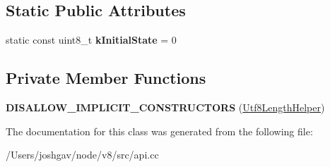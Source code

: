 \subsection*{Static Public Attributes}
\begin{DoxyCompactItemize}
\item 
static const uint8\+\_\+t {\bfseries k\+Initial\+State} = 0\hypertarget{classv8_1_1_utf8_length_helper_a20624c47006b9117c0c7079f8a7f6f85}{}\label{classv8_1_1_utf8_length_helper_a20624c47006b9117c0c7079f8a7f6f85}

\end{DoxyCompactItemize}
\subsection*{Private Member Functions}
\begin{DoxyCompactItemize}
\item 
{\bfseries D\+I\+S\+A\+L\+L\+O\+W\+\_\+\+I\+M\+P\+L\+I\+C\+I\+T\+\_\+\+C\+O\+N\+S\+T\+R\+U\+C\+T\+O\+RS} (\hyperlink{classv8_1_1_utf8_length_helper}{Utf8\+Length\+Helper})\hypertarget{classv8_1_1_utf8_length_helper_abfcd11e5d66380d915786e89086f016b}{}\label{classv8_1_1_utf8_length_helper_abfcd11e5d66380d915786e89086f016b}

\end{DoxyCompactItemize}


The documentation for this class was generated from the following file\+:\begin{DoxyCompactItemize}
\item 
/\+Users/joshgav/node/v8/src/api.\+cc\end{DoxyCompactItemize}
